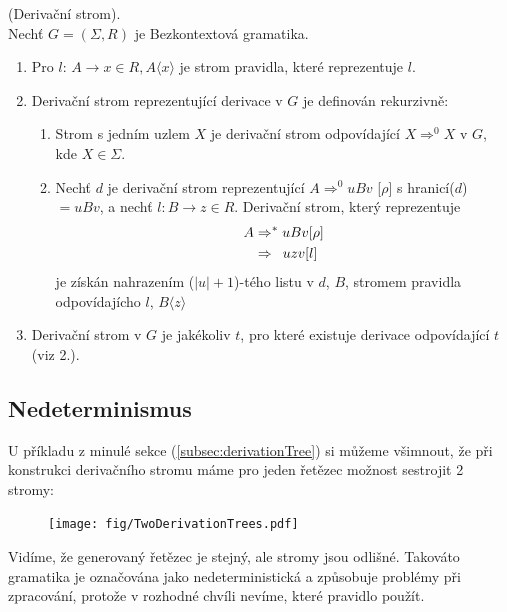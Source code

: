 \begin{defn}
  (Derivační strom). \cite[str. 92]{MedunaIFJ}\\
  Nechť $G = (\Sigma, R)$ je Bezkontextová gramatika.\\
  \begin{enumerate}
    \item Pro $l$: $A \rightarrow x \in R, A\langle x\rangle$ je strom pravidla, které reprezentuje $l$.
    \item Derivační strom reprezentující derivace v $G$ je definován rekurzivně:
    \begin{enumerate}
      \item Strom s jedním uzlem $X$ je derivační strom odpovídající $X \Rightarrow^0 X$ v $G$, kde $X \in \Sigma$.
      \item Nechť $d$ je derivační strom reprezentující
            $A \Rightarrow^0 uBv$ [$\rho$] s hranicí($d$) $ = uBv$, a nechť $l: B \rightarrow z \in R$.
            Derivační strom, který reprezentuje
            \begin{align}
                A & \Rightarrow^* uBv [\rho] \nonumber\\
                  & \Rightarrow \hphantom{*} uzv [l] \nonumber
            \end{align}
            je získán nahrazením ($|u|+1$)-tého listu v $d$, $B$, stromem pravidla odpovídajícho $l$, $B\langle z\rangle$
    \end{enumerate}
    \item Derivační strom v $G$ je jakékoliv $t$, pro které existuje derivace odpovídající $t$ (viz 2.).
  \end{enumerate}
\end{defn}

\subsection{Nedeterminismus}
\label{subec:nondeterminsm}

U příkladu z minulé sekce (\ref{subsec:derivationTree}) si můžeme všimnout,
že při konstrukci derivačního stromu máme pro jeden řetězec možnost sestrojit
2 stromy:

\begin{figure}[H]
  \centering
  \texttt{[image: fig/TwoDerivationTrees.pdf]}
\end{figure}

Vidíme, že generovaný řetězec je stejný, ale stromy jsou odlišné.
Takováto gramatika je označována jako nedeterministická a způsobuje problémy při
zpracování, protože v rozhodné chvíli nevíme, které pravidlo použít.\\

